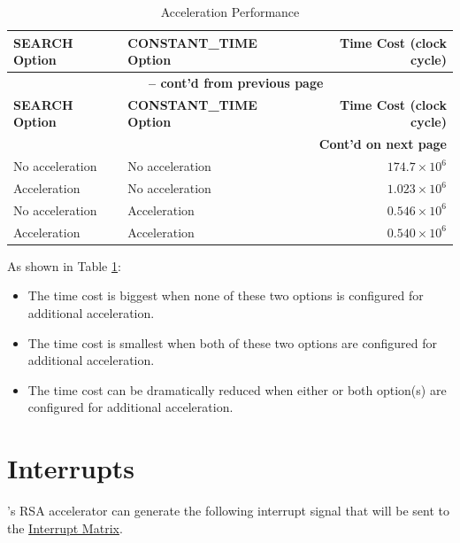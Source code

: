 \documentclass[main\_\_EN.tex]{subfiles}
\begin{document}
\begin{longtable}{ | l | l | r | }
    \caption{Acceleration Performance}\label{tab:accelerationeffect}
    \\\hline
    \rowcolor{lightgray}
        \textbf{SEARCH Option} & \textbf{CONSTANT\_TIME Option} & \textbf{Time Cost (clock cycle)}  \\ \hline
        \endfirsthead
        \multicolumn{3}{c}{\bfseries \tablename\ \thetable{} -- cont'd from previous page}\\\hline

        \rowcolor{lightgray}
        \textbf{SEARCH Option} & \textbf{CONSTANT\_TIME Option} & \textbf{Time Cost (clock cycle)}  \\ \hline
        \endhead

        \multicolumn{3}{r}{\textbf{Cont'd on next page}} \\
        \endfoot
        \endlastfoot
        \hline
    No acceleration & No acceleration   & $174.7 \times 10^6$   \\ \hline
    Acceleration     & No acceleration   & $1.023 \times 10^6$   \\ \hline
    No acceleration & Acceleration      & $0.546 \times 10^6$   \\ \hline
    Acceleration    & Acceleration      & $0.540 \times 10^6$   \\ \hline
\end{longtable}

As shown in Table \ref{tab:accelerationeffect}:

\begin{itemize}
    \item The time cost is biggest when none of these two options is configured for additional acceleration.
    \item The time cost is smallest when both of these two options are configured for additional acceleration.
    \item The time cost can be dramatically reduced when either or both option(s) are configured for additional acceleration.
\end{itemize}



\section{Interrupts}

\chipname{}'s RSA accelerator can generate the following interrupt signal that will be sent to the \hyperref[mod:intmtrx]{Interrupt Matrix}.
\end{document}
